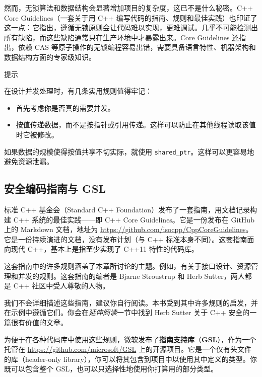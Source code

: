 然而，无锁算法和数据结构会显著增加项目的复杂度，这已不是什么秘密。C++ Core Guidelines（一套关于用 C++ 编写代码的指南、规则和最佳实践）也印证了这一点：它指出，遵循无锁原则会让代码难以实现，更难调试。几乎不可能检测出所有缺陷，而这些缺陷通常只在生产环境中才暴露出来。Core Guidelines 还指出，依赖 CAS 等原子操作的无锁编程容易出错，需要具备语言特性、机器架构和数据结构方面的专家级知识。

\begin{myTip}{提示}

在设计并发处理时，有几条实用规则值得牢记：

\begin{itemize}
\item 首先考虑你是否真的需要并发。
\item 按值传递数据，而不是按指针或引用传递。这样可以防止在其他线程读取该值时它被修改。
\end{itemize}

\label{idx:1027}
如果数据的规模使得按值共享不切实际，就使用 \texttt{shared\_\allowbreak{}ptr}。这样可以更容易地避免资源泄漏。
\end{myTip}

\subsection{安全编码指南与 GSL}

\label{idx:1028}
标准 C++ 基金会（Standard C++ Foundation）发布了一套指南，用文档记录构建 C++ 系统的最佳实践——即 C++ Core Guidelines。它是一份发布在 GitHub 上的 Markdown 文档，地址为 \href{https://github.com/isocpp/CppCoreGuidelines}{https://github.com/isocpp/CppCoreGuidelines}。它是一份持续演进的文档，没有发布计划（与 C++ 标准本身不同）。这套指南面向现代 C++，基本上是指至少实现了 C++11 特性的代码库。

\label{idx:1029}
这套指南中的许多规则涵盖了本章所讨论的主题。例如，有关于接口设计、资源管理和并发的规则。这套指南的编者是 Bjarne Stroustrup 和 Herb Sutter，两人都是 C++ 社区中受人尊敬的人物。

我们不会详细描述这些指南，建议你自行阅读。本书受到其中许多规则的启发，并在示例中遵循它们。你会在\emph{延伸阅读}一节中找到 Herb Sutter 关于 C++ 安全的一篇很有价值的文章。

为便于在各种代码库中使用这些规则，微软发布了\textbf{指南支持库}（\textbf{GSL}），作为一个托管在 \href{https://github.com/microsoft/GSL}{https://github.com/microsoft/GSL} 上的开源项目。它是一个仅有头文件的库（header-only library），你可以将其包含到项目中以使用其中定义的类型。你既可以包含整个 GSL，也可以只选择性地使用你打算用的部分类型。


